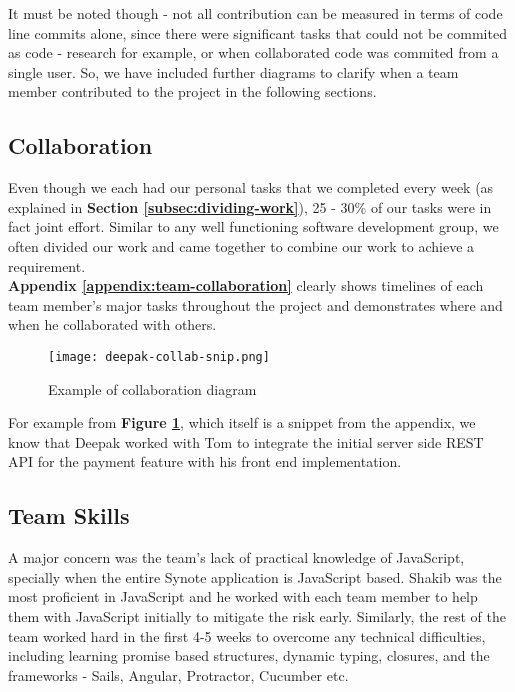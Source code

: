 It must be noted though - not all contribution can be measured in terms of code line commits alone, since there were significant tasks that could not be commited as code - research for example, or when collaborated code was commited from a single user. So, we have included further diagrams to clarify when a team member contributed to the project in the following sections.

\subsection{Collaboration}
\label{subsec:collaboration}

Even though we each had our personal tasks that we completed every week (as explained in \textbf{Section \ref{subsec:dividing-work}}), 25 - 30\% of our tasks were in fact joint effort. Similar to any well functioning software development group, we often divided our work and came together to combine our work to achieve a requirement.\\

\textbf{Appendix \ref{appendix:team-collaboration}} clearly shows timelines of each team member's major tasks throughout the project and demonstrates where and when he collaborated with others.\\

\begin{figure}[!hbt]
  	\centering
 	\texttt{[image: deepak-collab-snip.png]}
  	\caption{Example of collaboration diagram}
 	\label{fig:deepak-collaboration-snippet}
\end{figure}

For example from \textbf{Figure \ref{fig:deepak-collaboration-snippet}}, which itself is a snippet from the appendix, we know that Deepak worked with Tom to integrate the initial server side REST API for the payment feature with his front end implementation.

\subsection{Team Skills}
\label{subsec:team-skills}

A major concern was the team's lack of practical knowledge of JavaScript, specially when the entire Synote application is JavaScript based. Shakib was the most proficient in JavaScript and he worked with each team member to help them with JavaScript initially to mitigate the risk early. Similarly, the rest of the team worked hard in the first 4-5 weeks to overcome any technical difficulties, including learning promise based structures, dynamic typing, closures, and the frameworks - Sails, Angular, Protractor, Cucumber etc.\\

